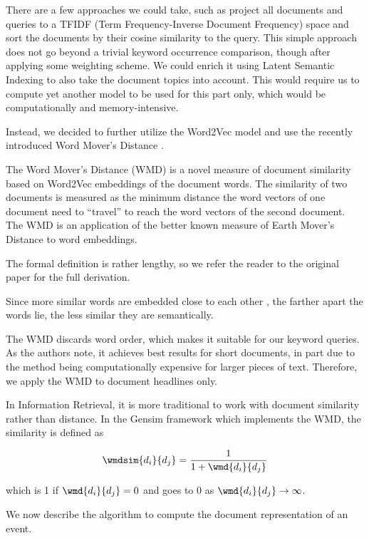 There are a few approaches we could take, such as project all documents and queries to a TFIDF (Term Frequency-Inverse Document Frequency) space \citep{information-retrieval} and sort the documents by their cosine similarity to the query. This simple approach does not go beyond a trivial keyword occurrence comparison, though after applying some weighting scheme. We could enrich it using Latent Semantic Indexing \citep{lsi} to also take the document topics into account. This would require us to compute yet another model to be used for this part only, which would be computationally and memory-intensive.

Instead, we decided to further utilize the Word2Vec model and use the recently introduced Word Mover's Distance \citep{wmd}.

The Word Mover's Distance (WMD) is a novel measure of document similarity based on Word2Vec embeddings of the document words. The similarity of two documents is measured as the minimum distance the word vectors of one document need to ``travel'' to reach the word vectors of the second document. The WMD is an application of the better known measure of Earth Mover's Distance \citep{emd} to word embeddings.

The formal definition is rather lengthy, so we refer the reader to the original paper \citep{wmd} for the full derivation.

Since more similar words are embedded close to each other \citep{linguistic-regularities}, the farther apart the words lie, the less similar they are semantically.

The WMD discards word order, which makes it suitable for our keyword queries. As the authors note, it achieves best results for short documents, in part due to the method being computationally expensive for larger pieces of text. Therefore, we apply the WMD to document headlines only.

In Information Retrieval, it is more traditional to work with document similarity rather than distance. In the Gensim framework \citep{gensim} which implements the WMD, the similarity is defined as

\begin{equation}
	\wmdsim{d_{i}}{d_{j}} = \frac{1}{1 + \wmd{d_{i}}{d_{j}}}
\end{equation}

which is 1 if $\wmd{d_{i}}{d_{j}} = 0$ and goes to 0 as $\wmd{d_{i}}{d_{j}} \to \infty$.

We now describe the algorithm to compute the document representation of an event.

